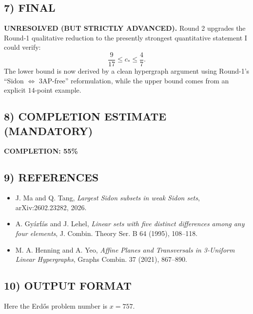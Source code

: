 \subsection*{7) FINAL}
\textbf{UNRESOLVED (BUT STRICTLY ADVANCED).}
Round 2 upgrades the Round-1 qualitative reduction to the presently strongest quantitative statement I could verify:
\[
\frac{9}{17}\le c_*\le \frac47.
\]
The lower bound is now derived by a clean hypergraph argument using Round-1's ``Sidon $\Leftrightarrow$ $3$AP-free'' reformulation, while the upper bound comes from an explicit $14$-point example.

\subsection*{8) COMPLETION ESTIMATE (MANDATORY)}
\textbf{COMPLETION: 55\%}

\subsection*{9) REFERENCES}
\begin{itemize}
\item J. Ma and Q. Tang, \emph{Largest Sidon subsets in weak Sidon sets}, arXiv:2602.23282, 2026.
\item A. Gy\'arf\'as and J. Lehel, \emph{Linear sets with five distinct differences among any four elements}, J. Combin. Theory Ser. B 64 (1995), 108--118.
\item M. A. Henning and A. Yeo, \emph{Affine Planes and Transversals in 3-Uniform Linear Hypergraphs}, Graphs Combin. 37 (2021), 867--890.
\end{itemize}

\subsection*{10) OUTPUT FORMAT}
Here the Erd\H{o}s problem number is $x=757$.

\bigskip

